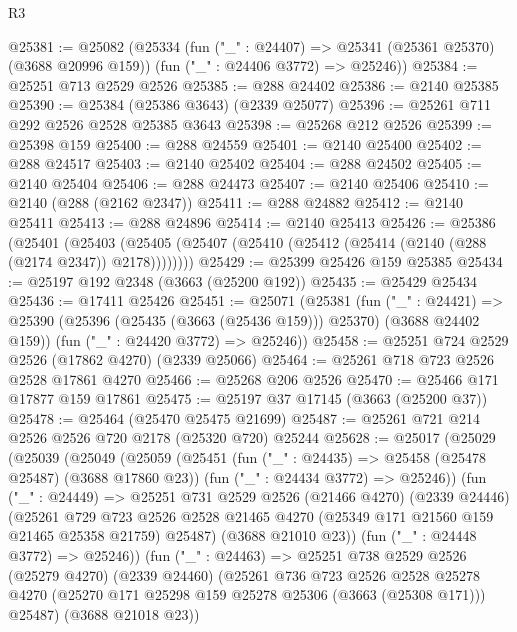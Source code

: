 \begin{lexlean}{R3}
\begin{coremodule}
@25381 := @25082
    (@25334
      (fun ("_" : @24407) => @25341 (@25361 @25370) (@3688 @20996 @159))
      (fun ("_" : @24406 @3772) => @25246))
@25384 := @25251 @713 @2529 @2526
@25385 := @288 @24402
@25386 := @2140 @25385
@25390 := @25384 (@25386 @3643) (@2339 @25077)
@25396 := @25261 @711 @292 @2526 @2528 @25385 @3643
@25398 := @25268 @212 @2526
@25399 := @25398 @159
@25400 := @288 @24559
@25401 := @2140 @25400
@25402 := @288 @24517
@25403 := @2140 @25402
@25404 := @288 @24502
@25405 := @2140 @25404
@25406 := @288 @24473
@25407 := @2140 @25406
@25410 := @2140 (@288 (@2162 @2347))
@25411 := @288 @24882
@25412 := @2140 @25411
@25413 := @288 @24896
@25414 := @2140 @25413
@25426 := @25386
    (@25401
      (@25403 (@25405 (@25407 (@25410 (@25412 (@25414 (@2140 (@288 (@2174 @2347)) @2178))))))))
@25429 := @25399 @25426 @159 @25385
@25434 := @25197 @192 @2348 (@3663 (@25200 @192))
@25435 := @25429 @25434
@25436 := @17411 @25426
@25451 := @25071
    (@25381
      (fun ("_" : @24421) =>
      @25390 (@25396 (@25435 (@3663 (@25436 @159))) @25370) (@3688 @24402 @159))
      (fun ("_" : @24420 @3772) => @25246))
@25458 := @25251 @724 @2529 @2526 (@17862 @4270) (@2339 @25066)
@25464 := @25261 @718 @723 @2526 @2528 @17861 @4270
@25466 := @25268 @206 @2526
@25470 := @25466 @171 @17877 @159 @17861
@25475 := @25197 @37 @17145 (@3663 (@25200 @37))
@25478 := @25464 (@25470 @25475 @21699)
@25487 := @25261 @721 @214 @2526 @2526 @720 @2178 (@25320 @720) @25244
@25628 := @25017
    (@25029
      (@25039
        (@25049
          (@25059
            (@25451
              (fun ("_" : @24435) => @25458 (@25478 @25487) (@3688 @17860 @23))
              (fun ("_" : @24434 @3772) => @25246))
            (fun ("_" : @24449) =>
            @25251
              @731
              @2529
              @2526
              (@21466 @4270)
              (@2339 @24446)
              (@25261
                @729
                @723
                @2526
                @2528
                @21465
                @4270
                (@25349 @171 @21560 @159 @21465 @25358 @21759)
                @25487)
              (@3688 @21010 @23))
            (fun ("_" : @24448 @3772) => @25246))
          (fun ("_" : @24463) =>
          @25251
            @738
            @2529
            @2526
            (@25279 @4270)
            (@2339 @24460)
            (@25261
              @736
              @723
              @2526
              @2528
              @25278
              @4270
              (@25270 @171 @25298 @159 @25278 @25306 (@3663 (@25308 @171)))
              @25487)
            (@3688 @21018 @23))

\end{coremodule}
\end{lexlean}
